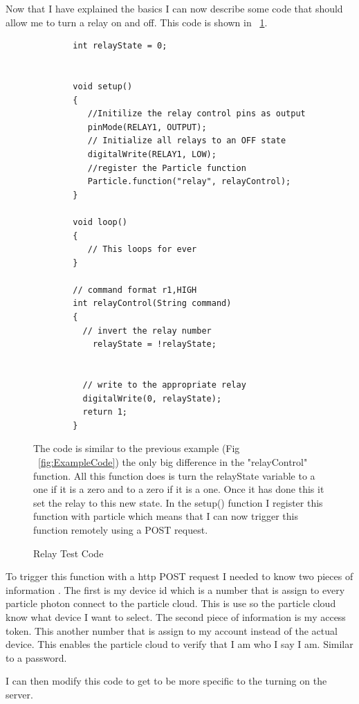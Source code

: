 \documentclass{article}
\begin{document}
Now that I have explained the basics I can now describe some code that should allow me to turn
a relay on and off. This code is shown in ~\ref{fig:relayTest}.
\begin{figure}
    \begin{lstlisting}
        int relayState = 0;


        void setup()
        {
           //Initilize the relay control pins as output
           pinMode(RELAY1, OUTPUT);
           // Initialize all relays to an OFF state
           digitalWrite(RELAY1, LOW);
           //register the Particle function
           Particle.function("relay", relayControl);
        }

        void loop()
        {
           // This loops for ever
        }

        // command format r1,HIGH
        int relayControl(String command)
        {
          // invert the relay number
            relayState = !relayState;


          // write to the appropriate relay
          digitalWrite(0, relayState);
          return 1;
        }
    \end{lstlisting}
    \caption{Relay Test Code} \label{fig:relayTest}
    \vspace{0.5cm}
    The code is similar to the previous example (Fig ~\ref{fig:ExampleCode}) the only big
    difference in the "relayControl" function. All this function does is turn the relayState
    variable to a one if it is a zero and to a zero if it is a one. Once it has done this it
    set the relay to this new state. In the setup() function I register this function with
    particle which means that I can now trigger this function remotely using a POST request.
\end{figure}

\pagebreak
To trigger this function with a http POST request I needed to know two pieces of information
. The first is my device id which is a number that is assign to every particle photon connect
to the particle cloud. This is use so the particle cloud know what device I want to select.
The second piece of information is my access token. This another number that is assign to
my account instead of the actual device. This enables the particle cloud to verify that I
am who I say I am. Similar to a password.

I can then modify this code to get to be more specific to the turning on the server.
\end{document}
